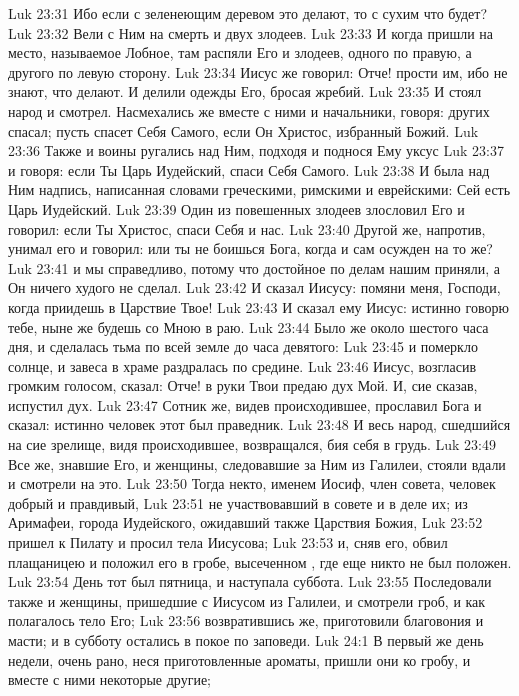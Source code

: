 \vs Luk 23:31 Ибо если с зеленеющим деревом это делают, то с сухим что будет?
\rsbpar\vs Luk 23:32 Вели с Ним на смерть и двух злодеев.
\vs Luk 23:33 И когда пришли на место, называемое Лобное, там распяли Его и злодеев, одного по правую, а другого по левую сторону.
\vs Luk 23:34 Иисус же говорил: Отче! прости им, ибо не знают, что делают. И делили одежды Его, бросая жребий.
\vs Luk 23:35 И стоял народ и смотрел. Насмехались же вместе с ними и начальники, говоря: других спасал; пусть спасет Себя Самого, если Он Христос, избранный Божий.
\vs Luk 23:36 Также и воины ругались над Ним, подходя и поднося Ему уксус
\vs Luk 23:37 и говоря: если Ты Царь Иудейский, спаси Себя Самого.
\vs Luk 23:38 И была над Ним надпись, написанная словами греческими, римскими и еврейскими: Сей есть Царь Иудейский.
\vs Luk 23:39 Один из повешенных злодеев злословил Его и говорил: если Ты Христос, спаси Себя и нас.
\vs Luk 23:40 Другой же, напротив, унимал его и говорил: или ты не боишься Бога, когда и сам осужден на то же?
\vs Luk 23:41 и мы  справедливо, потому что достойное по делам нашим приняли, а Он ничего худого не сделал.
\vs Luk 23:42 И сказал Иисусу: помяни меня, Господи, когда приидешь в Царствие Твое!
\vs Luk 23:43 И сказал ему Иисус: истинно говорю тебе, ныне же будешь со Мною в раю.
\rsbpar\vs Luk 23:44 Было же около шестого часа дня, и сделалась тьма по всей земле до часа девятого:
\vs Luk 23:45 и померкло солнце, и завеса в храме раздралась по средине.
\vs Luk 23:46 Иисус, возгласив громким голосом, сказал: Отче! в руки Твои предаю дух Мой. И, сие сказав, испустил дух.
\vs Luk 23:47 Сотник же, видев происходившее, прославил Бога и сказал: истинно человек этот был праведник.
\vs Luk 23:48 И весь народ, сшедшийся на сие зрелище, видя происходившее, возвращался, бия себя в грудь.
\vs Luk 23:49 Все же, знавшие Его, и женщины, следовавшие за Ним из Галилеи, стояли вдали и смотрели на это.
\rsbpar\vs Luk 23:50 Тогда некто, именем Иосиф, член совета, человек добрый и правдивый,
\vs Luk 23:51 не участвовавший в совете и в деле их; из Аримафеи, города Иудейского, ожидавший также Царствия Божия,
\vs Luk 23:52 пришел к Пилату и просил тела Иисусова;
\vs Luk 23:53 и, сняв его, обвил плащаницею и положил его в гробе, высеченном , где еще никто не был положен.
\vs Luk 23:54 День тот был пятница, и наступала суббота.
\vs Luk 23:55 Последовали также и женщины, пришедшие с Иисусом из Галилеи, и смотрели гроб, и как полагалось тело Его;
\vs Luk 23:56 возвратившись же, приготовили благовония и масти; и в субботу остались в покое по заповеди.
\vs Luk 24:1 В первый же день недели, очень рано, неся приготовленные ароматы, пришли они ко гробу, и вместе с ними некоторые другие;
